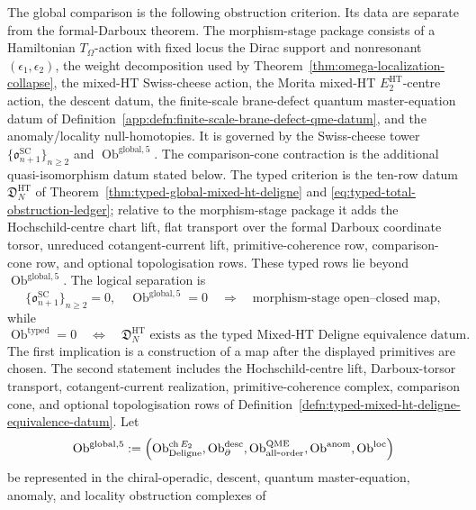 \documentclass[11pt]{memoir}
\begin{document}
\begin{thm}
  The global comparison is the following obstruction criterion.  Its
  data are separate from the formal-Darboux theorem.  The morphism-stage
  package consists of a Hamiltonian \(T_\Omega\)-action with fixed locus
  the Dirac support and nonresonant \((\epsilon_1,\epsilon_2)\), the
  weight decomposition used by
  Theorem~\ref{thm:omega-localization-collapse}, the mixed-HT
  Swiss-cheese action, the Morita mixed-HT
  \(E_2^{\mathrm{HT}}\)-centre action, the descent datum, the
  finite-scale brane-defect quantum master-equation datum of
  Definition~\ref{app:defn:finite-scale-brane-defect-qme-datum}, and
  the anomaly/locality null-homotopies.  It is governed by the
  Swiss-cheese tower
  \(\{\mathfrak o^{\mathrm{SC}}_{n+1}\}_{n\ge2}\) and
  \(\operatorname{Ob}^{\mathrm{global},5}\).  The comparison-cone
  contraction is the additional quasi-isomorphism datum stated below.
  The typed criterion is the ten-row datum
  \(\mathfrak D_N^{\mathrm{HT}}\) of
  Theorem~\ref{thm:typed-global-mixed-ht-deligne} and
  \eqref{eq:typed-total-obstruction-ledger}; relative to the
  morphism-stage package it adds the Hochschild-centre chart lift, flat
  transport over the formal Darboux coordinate torsor, unreduced
  cotangent-current lift, primitive-coherence row, comparison-cone row,
  and optional topologisation rows.  These typed rows lie beyond
  \(\operatorname{Ob}^{\mathrm{global},5}\).  The logical
  separation is
  \[
    \{\mathfrak o^{\mathrm{SC}}_{n+1}\}_{n\ge2}=0,\quad
    \operatorname{Ob}^{\mathrm{global},5}=0
    \quad\Longrightarrow\quad
    \text{morphism-stage open--closed map},
  \]
  while
  \[
    \operatorname{Ob}^{\mathrm{typed}}=0
    \quad\Longleftrightarrow\quad
    \mathfrak D^{\mathrm{HT}}_N
    \text{ exists as the typed Mixed-HT Deligne equivalence datum}.
  \]
  The first implication is a construction of a map after the displayed
  primitives are chosen.  The second statement includes the
  Hochschild-centre lift, Darboux-torsor transport, cotangent-current
  realization, primitive-coherence complex, comparison cone, and optional
  topologisation rows of Definition~\ref{defn:typed-mixed-ht-deligne-equivalence-datum}.
  Let
  \[
    \operatorname{Ob}^{\mathrm{global},5}
      :=
    \Bigl(
    \operatorname{Ob}^{\mathrm{ch}\,E_2}_{\mathrm{Deligne}},
    \operatorname{Ob}^{\mathrm{desc}}_{\partial},
    \operatorname{Ob}^{\mathrm{QME}}_{\mathrm{all\mbox{-}order}},
    \operatorname{Ob}^{\mathrm{anom}},
    \operatorname{Ob}^{\mathrm{loc}}
    \Bigr)
	  \]
	  be represented in the chiral-operadic, descent, quantum
	  master-equation, anomaly, and locality obstruction complexes of

\end{thm}
\end{document}
